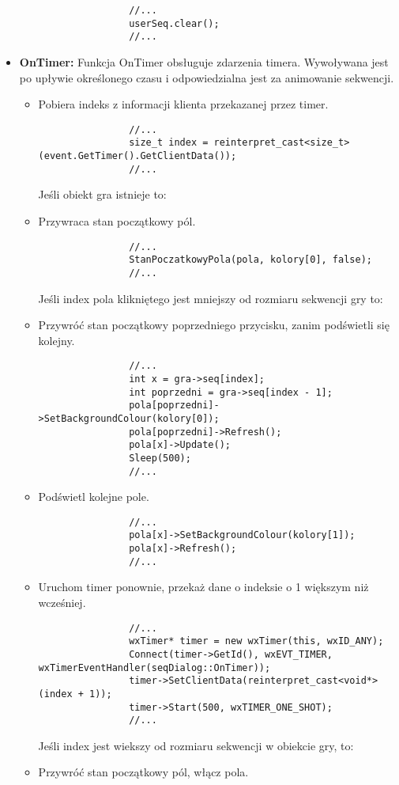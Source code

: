 \documentclass[]{report}
\begin{document}
\begin{itemize}
\begin{itemize}
			\begin{lstlisting}
				//...
				userSeq.clear();
				//...
			\end{lstlisting}
		\end{itemize}
		\item \textbf{OnTimer:} Funkcja OnTimer obsługuje zdarzenia timera. Wywoływana jest po upływie określonego czasu i odpowiedzialna jest za animowanie sekwencji.
		\begin{itemize}
			\item Pobiera indeks z informacji klienta przekazanej przez timer.
			\begin{lstlisting}
				//...
				size_t index = reinterpret_cast<size_t>(event.GetTimer().GetClientData());
				//...
			\end{lstlisting}
			Jeśli obiekt gra istnieje to:
			\item Przywraca stan początkowy pól.
			\begin{lstlisting}
				//...
				StanPoczatkowyPola(pola, kolory[0], false);
				//...
			\end{lstlisting}
			Jeśli index pola klikniętego jest mniejszy od rozmiaru sekwencji gry to:
			\item Przywróć stan początkowy poprzedniego przycisku, zanim podświetli się kolejny.
			\begin{lstlisting}
				//...
				int x = gra->seq[index];
				int poprzedni = gra->seq[index - 1];
				pola[poprzedni]->SetBackgroundColour(kolory[0]);
				pola[poprzedni]->Refresh();
				pola[x]->Update();
				Sleep(500);
				//...
			\end{lstlisting}
			\item Podświetl kolejne pole.
			\begin{lstlisting}
				//...
				pola[x]->SetBackgroundColour(kolory[1]);
				pola[x]->Refresh();
				//...
			\end{lstlisting}
			\item Uruchom timer ponownie, przekaż dane o indeksie o 1 większym niż wcześniej.
			\begin{lstlisting}
				//...
				wxTimer* timer = new wxTimer(this, wxID_ANY);
				Connect(timer->GetId(), wxEVT_TIMER, wxTimerEventHandler(seqDialog::OnTimer));
				timer->SetClientData(reinterpret_cast<void*>(index + 1));
				timer->Start(500, wxTIMER_ONE_SHOT);
				//...
			\end{lstlisting}
			Jeśli index jest wiekszy od rozmiaru sekwencji w obiekcie gry, to:
			\item Przywróć stan początkowy pól, włącz pola.

\end{itemize}
\end{itemize}
\end{document}
